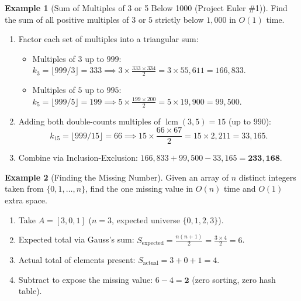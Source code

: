 \documentclass[11pt,a4paper]{article}
\theoremstyle{definition}
\newtheorem{example}{Example}[section]
\begin{document}
\begin{example}[Sum of Multiples of 3 or 5 Below 1000 (Project Euler \#1)]
Find the sum of all positive multiples of $3$ or $5$ strictly below $1{,}000$ in $O(1)$ time.
\begin{enumerate}
    \item Factor each set of multiples into a triangular sum:
    \begin{itemize}
        \item Multiples of $3$ up to $999$: $k_3 = \lfloor 999 / 3 \rfloor = 333 \implies 3 \times \frac{333 \times 334}{2} = 3 \times 55{,}611 = 166{,}833$.
        \item Multiples of $5$ up to $995$: $k_5 = \lfloor 999 / 5 \rfloor = 199 \implies 5 \times \frac{199 \times 200}{2} = 5 \times 19{,}900 = 99{,}500$.
    \end{itemize}
    \item Adding both double-counts multiples of $\operatorname{lcm}(3, 5) = 15$ (up to $990$):
    \[
        k_{15} = \lfloor 999 / 15 \rfloor = 66 \implies 15 \times \frac{66 \times 67}{2} = 15 \times 2{,}211 = 33{,}165.
    \]
    \item Combine via Inclusion-Exclusion: $166{,}833 + 99{,}500 - 33{,}165 = \mathbf{233{,}168}$.
\end{enumerate}
\end{example}

\begin{example}[Finding the Missing Number]
Given an array of $n$ distinct integers taken from $\{0, 1, \dots, n\}$, find the one missing value in $O(n)$ time and $O(1)$ extra space.
\begin{enumerate}
    \item Take $A = [3, 0, 1]$ ($n = 3$, expected universe $\{0, 1, 2, 3\}$).
    \item Expected total via Gauss's sum: $S_{\text{expected}} = \frac{n(n + 1)}{2} = \frac{3 \times 4}{2} = 6$.
    \item Actual total of elements present: $S_{\text{actual}} = 3 + 0 + 1 = 4$.
    \item Subtract to expose the missing value: $6 - 4 = \mathbf{2}$ (zero sorting, zero hash table).
\end{enumerate}
\end{example}
\end{document}
